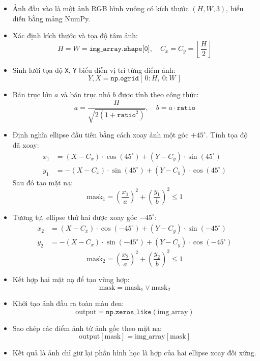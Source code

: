 \begin{itemize}
  \item Ảnh đầu vào là một ảnh RGB hình vuông có kích thước \( (H, W, 3) \), biểu diễn bằng mảng NumPy.

  \item Xác định kích thước và tọa độ tâm ảnh:
        \[
          H = W = \texttt{img\_array.shape[0]}, \quad C_x = C_y = \left\lfloor \frac{H}{2} \right\rfloor
        \]

  \item Sinh lưới tọa độ \texttt{X}, \texttt{Y} biểu diễn vị trí từng điểm ảnh:
        \[
          Y, X = \texttt{np.ogrid}[\,0:H,\ 0:W\,]
        \]

  \item Bán trục lớn \( a \) và bán trục nhỏ \( b \) được tính theo công thức:
        \[
          a = \frac{H}{\sqrt{2(1 + \texttt{ratio}^2)}}, \quad b = a \cdot \texttt{ratio}
        \]

  \item Định nghĩa ellipse đầu tiên bằng cách xoay ảnh một góc \( +45^\circ \). Tính tọa độ đã xoay:
        \[
          \begin{aligned}
            x_1 & = (X - C_x) \cdot \cos(45^\circ) + (Y - C_y) \cdot \sin(45^\circ)  \\
            y_1 & = -(X - C_x) \cdot \sin(45^\circ) + (Y - C_y) \cdot \cos(45^\circ)
          \end{aligned}
        \]
        Sau đó tạo mặt nạ:
        \[
          \text{mask}_1 = \left(\frac{x_1}{a}\right)^2 + \left(\frac{y_1}{b}\right)^2 \leq 1
        \]

  \item Tương tự, ellipse thứ hai được xoay góc \( -45^\circ \):
        \[
          \begin{aligned}
            x_2 & = (X - C_x) \cdot \cos(-45^\circ) + (Y - C_y) \cdot \sin(-45^\circ)  \\
            y_2 & = -(X - C_x) \cdot \sin(-45^\circ) + (Y - C_y) \cdot \cos(-45^\circ)
          \end{aligned}
        \]
        \[
          \text{mask}_2 = \left(\frac{x_2}{a}\right)^2 + \left(\frac{y_2}{b}\right)^2 \leq 1
        \]

  \item Kết hợp hai mặt nạ để tạo vùng hợp:
        \[
          \text{mask} = \text{mask}_1 \lor \text{mask}_2
        \]

  \item Khởi tạo ảnh đầu ra toàn màu đen:
        \[
          \text{output} = \texttt{np.zeros\_like}(\text{img\_array})
        \]

  \item Sao chép các điểm ảnh từ ảnh gốc theo mặt nạ:
        \[
          \text{output}[\text{mask}] = \text{img\_array}[\text{mask}]
        \]

  \item Kết quả là ảnh chỉ giữ lại phần hình học là hợp của hai ellipse xoay đối xứng.
\end{itemize}

